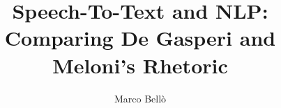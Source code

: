 \documentclass[manuscript,screen,review]{acmart}
\begin{document}
\title{Speech-To-Text and NLP: Comparing De Gasperi and Meloni's Rhetoric}

\author{Marco Bellò}



\renewcommand{\shortauthors}{Bellò}
\end{document}
